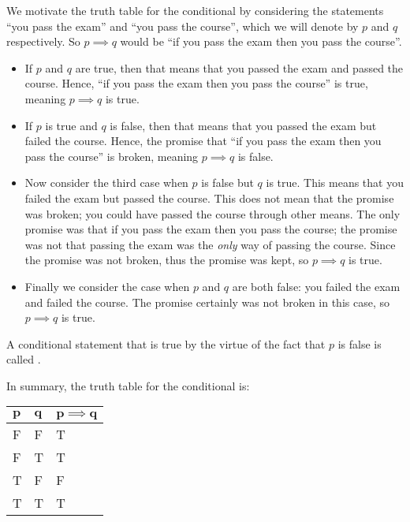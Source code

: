 We motivate the truth table for the conditional by considering the statements ``you pass the exam'' and ``you pass the course'', which we will denote by $p$ and $q$ respectively. So $p \implies q$ would be ``if you pass the exam then you pass the course''.
\begin{itemize}
    \item If $p$ and $q$ are true, then that means that you passed the exam and passed the course. Hence, ``if you pass the exam then you pass the course'' is true, meaning $p \implies q$ is true.
    \item If $p$ is true and $q$ is false, then that means that you passed the exam but failed the course. Hence, the promise that ``if you pass the exam then you pass the course'' is broken, meaning $p \implies q$ is false.
    \item Now consider the third case when $p$ is false but $q$ is true. This means that you failed the exam but passed the course. This does not mean that the promise was broken; you could have passed the course through other means. The only promise was that if you pass the exam then you pass the course; the promise was not that passing the exam was the \textit{only} way of passing the course. Since the promise was not broken, thus the promise was kept, so $p \implies q$ is true.
    \item Finally we consider the case when $p$ and $q$ are both false: you failed the exam and failed the course. The promise certainly was not broken in this case, so $p \implies q$ is true.
\end{itemize}
\begin{remark}
    A conditional statement that is true by the virtue of the fact that $p$ is false is called .
\end{remark}

In summary, the truth table for the conditional is:
\begin{table}[h]
    \centering
    \begin{tabular}{|l|l||l|}
        \hline
        $\boldsymbol{p}$ & $\boldsymbol{q}$ & $\boldsymbol{p\implies q}$ \\ \hline
        F   & F   & T             \\ \hline
        F   & T   & T             \\ \hline
        T   & F   & F             \\ \hline
        T   & T   & T             \\ \hline
    \end{tabular}
\end{table}


